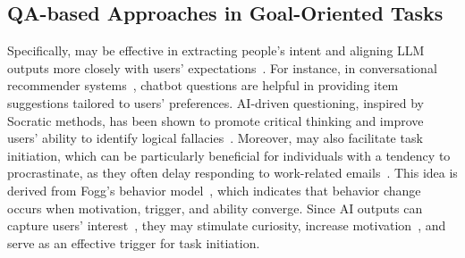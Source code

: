 \subsection{QA-based Approaches in Goal-Oriented Tasks}
\label{sec:2.2}
Specifically,  may be effective in extracting people's intent and aligning LLM outputs more closely with users' expectations~\cite{cao2023comprehensive}.
For instance, in conversational recommender systems~\cite{jannach2021survey}, chatbot questions are helpful in providing item suggestions tailored to users' preferences.
AI-driven questioning, inspired by Socratic methods, has been shown to promote critical thinking and improve users' ability to identify logical fallacies~\cite{danry2023dont}.
Moreover,  may also facilitate task initiation, which can be particularly beneficial for individuals with a tendency to procrastinate, as they often delay responding to work-related emails~\cite{shirren2011decisional}.
This idea is derived from Fogg’s behavior model~\cite{fogg2009behavior}, which indicates that behavior change occurs when motivation, trigger, and ability converge.
Since AI outputs can capture users’ interest~\cite{brandtzaeg2017why, ling2021factors}, they may stimulate curiosity, increase motivation~\cite{berlyne1960conflict}, and serve as an effective trigger for task initiation.

